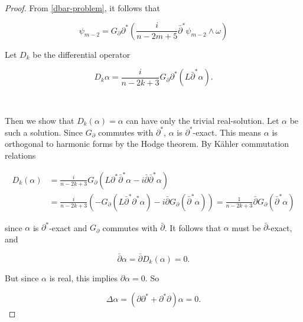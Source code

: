 \documentclass[10pt,a4paper]{amsart}
\newcommand{\sbpartial}{\bar{\partial}^*}
\newcommand{\bpartial}{\bar{\partial}}
\numberwithin{equation}{section}
\begin{document}




    


\begin{proof}


From \eqref{dbar-problem}, it follows that 

\begin{equation}\label{claim1.1-1}
    \psi_{m-2} = G_{\partial} \partial^*\left( \frac{i}{n-2m+ 5} \sbpartial \psi_{m-2} \wedge \omega \right)
\end{equation}

Let $D_k$ be the differential operator 

$$D_k \alpha =\frac{i}{n-2k+3} G_{\partial} \partial^*\left(  L \sbpartial \alpha \right).$$

\ 

Then we show that $D_k(\alpha) = \alpha$ can have only the trivial real-solution. Let $\alpha$ be such a solution. Since $G_{\partial}$ commutes with $\partial^*$, $\alpha$ is $\partial^*$-exact. This means $\alpha$ is orthogonal to harmonic forms by the Hodge theorem. By K\"ahler commutation relations

\begin{equation*}
\begin{aligned}
       D_k(\alpha) &= \frac{i}{n-2k+3} G_{\partial}(L \partial^* \sbpartial \alpha - i \bpartial \sbpartial \alpha) \\
       &= \frac{i}{n-2k+3} \left(-G_{\partial}(L \sbpartial \partial^* \alpha) - i \bpartial G_{\partial}(\sbpartial \alpha)\right) = \frac{1}{n-2k+3}  \bpartial G_{\partial}(\sbpartial \alpha)
\end{aligned}
\end{equation*}


\noindent since $\alpha$ is $\partial^*$-exact and $G_{\partial}$ commutes with $\bpartial$. It follows that $\alpha$ must be $\bpartial$-exact, and


$$\bpartial \alpha = \bpartial D_k(\alpha) = 0.$$

But since $\alpha$ is real, this implies $\partial \alpha =0$. So 

$$\Delta \alpha = (\partial \partial^* +\partial^* \partial) \alpha = 0. $$


\end{proof}
\end{document}
